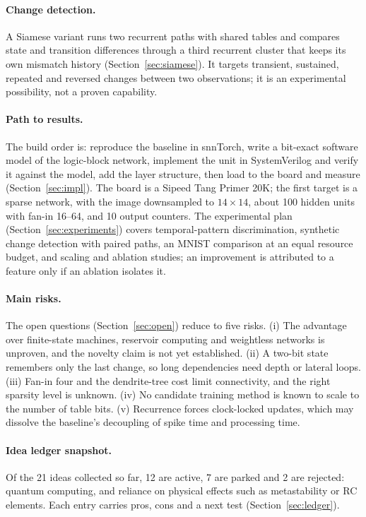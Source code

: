 \paragraph{Change detection.} A Siamese variant runs two recurrent paths with shared tables and compares state and transition differences through a third recurrent cluster that keeps its own mismatch history (Section~\ref{sec:siamese}). It targets transient, sustained, repeated and reversed changes between two observations; it is an experimental possibility, not a proven capability.

\paragraph{Path to results.} The build order is: reproduce the baseline in snnTorch, write a bit-exact software model of the logic-block network, implement the unit in SystemVerilog and verify it against the model, add the layer structure, then load to the board and measure (Section~\ref{sec:impl}). The board is a Sipeed Tang Primer 20K; the first target is a sparse network, with the image downsampled to $14\times14$, about 100 hidden units with fan-in 16--64, and 10 output counters. The experimental plan (Section~\ref{sec:experiments}) covers temporal-pattern discrimination, synthetic change detection with paired paths, an MNIST comparison at an equal resource budget, and scaling and ablation studies; an improvement is attributed to a feature only if an ablation isolates it.

\paragraph{Main risks.} The open questions (Section~\ref{sec:open}) reduce to five risks. (i) The advantage over finite-state machines, reservoir computing and weightless networks is unproven, and the novelty claim is not yet established. (ii) A two-bit state remembers only the last change, so long dependencies need depth or lateral loops. (iii) Fan-in four and the dendrite-tree cost limit connectivity, and the right sparsity level is unknown. (iv) No candidate training method is known to scale to the number of table bits. (v) Recurrence forces clock-locked updates, which may dissolve the baseline's decoupling of spike time and processing time.

\paragraph{Idea ledger snapshot.} Of the 21 ideas collected so far, 12 are active, 7 are parked and 2 are rejected: quantum computing, and reliance on physical effects such as metastability or RC elements. Each entry carries pros, cons and a next test (Section~\ref{sec:ledger}).

\newpage